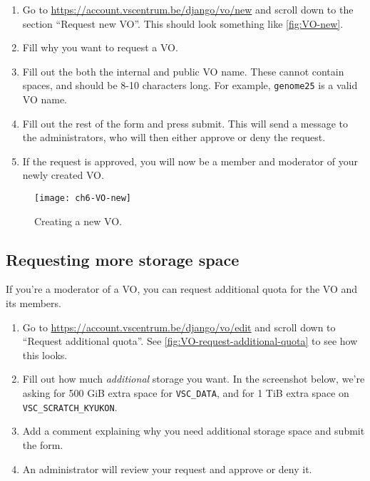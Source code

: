 \begin{enumerate}
    \item Go to \url{https://account.vscentrum.be/django/vo/new} and scroll down
        to the section ``Request new VO''. This should look something like
        \autoref{fig:VO-new}.
    \item Fill why you want to request a VO.
    \item Fill out the both the internal and public VO name. These cannot contain
        spaces, and should be 8-10 characters long. For example, \lstinline|genome25| is
        a valid VO name.
    \item Fill out the rest of the form and press submit. This will send a message
        to the \hpc administrators, who will then either approve or deny the request.
    \item If the request is approved, you will now be a member and moderator of your
        newly created VO.
\end{enumerate}

\begin{figure}[!htbp]
  \caption{Creating a new VO.}
  \centering
    \texttt{[image: ch6-VO-new]}
\end{figure}\label{fig:VO-new}

\subsection{Requesting more storage space}
\label{subsec:requesting-more-storage-space}

If you're a moderator of a VO, you can request additional quota for the VO and
its members.

\begin{enumerate}
    \item Go to \url{https://account.vscentrum.be/django/vo/edit} and scroll down
        to ``Request additional quota''. See \autoref{fig:VO-request-additional-quota} to see how this looks.
    \item Fill out how much \emph{additional} storage you want. In the screenshot below,
        we're asking for 500 GiB extra space for \lstinline|VSC_DATA|, and for 1 TiB extra
        space on \lstinline|VSC_SCRATCH_KYUKON|.
    \item Add a comment explaining why you need additional storage space and submit
        the form.
    \item An \hpc administrator will review your request and approve or deny it.
\end{enumerate}


